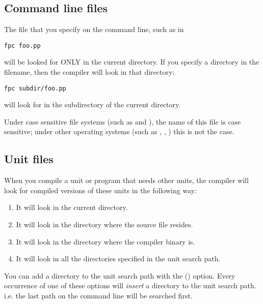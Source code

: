 \subsection{Command line files}
The file that you specify on the command line, such as in
\begin{verbatim}
fpc foo.pp
\end{verbatim}
will be looked for ONLY in the current directory. If you specify a directory
in the filename, then the compiler will look in that directory:
\begin{verbatim}
fpc subdir/foo.pp
\end{verbatim}
will look for  in the subdirectory  of the current
directory.

Under case sensitive file systems (such as \linux and \unix), the name of this
file is case sensitive; under other operating systems (such as \dos, \windowsnt, \ostwo)
this is not the case.

\subsection{Unit files}
\label{se:unitsearching}

When you compile a unit or program that needs other units, the compiler will
look for compiled versions of these units in the following way:
\begin{enumerate}
\item It will look in the current directory.
\item It will look in the directory where the source file resides.
\item It will look in the directory where the compiler binary is.
\item It will look in all the directories specified in the unit search path.
\end{enumerate}

You can add a directory to the unit search path with the ()
option. Every occurrence of one of these options will {\em insert}
a directory to the unit search path. i.e. the last path on the command line
will be searched first.

